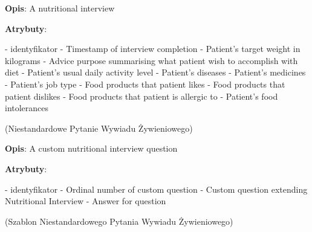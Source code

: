 \begin{enumerate}[label={\textbf{KAT/\protect\threedigits{\theenumi}}}, wide, labelwidth=!, labelindent=0pt, labelsep=0pt, series=reqs]
    \textbf{Opis}: A nutritional interview
    \par
    \textbf{Atrybuty}:
    \begin{itemize}[series=atr, wide, align=left, leftmargin=190pt]
         \label{kat:NutritionalInterview:id} - identyfikator
         \label{kat:NutritionalInterview:completionDate} - Timestamp of interview completion
         \label{kat:NutritionalInterview:targetWeight} - Patient's target weight in kilograms
         \label{kat:NutritionalInterview:advicePurpose} - Advice purpose summarising what patient wish to accomplish with diet
         \label{kat:NutritionalInterview:physicalActivity} - Patient's usual daily activity level
         \label{kat:NutritionalInterview:diseases} - Patient's diseases
         \label{kat:NutritionalInterview:medicines} - Patient's medicines
         \label{kat:NutritionalInterview:jobType} - Patient's job type
         \label{kat:NutritionalInterview:likedProducts} - Food products that patient likes
         \label{kat:NutritionalInterview:dislikedProducts} - Food products that patient dislikes
         \label{kat:NutritionalInterview:foodAllergies} - Food products that patient is allergic to
         \label{kat:NutritionalInterview:foodIntolerances} - Patient's food intolerances
    \end{itemize}

     \label{kat:CustomNutritionalInterviewQuestion} (Niestandardowe Pytanie Wywiadu Żywieniowego)

    \textbf{Opis}: A custom nutritional interview question
    \par
    \textbf{Atrybuty}:
    \begin{itemize}[series=atr, wide, align=left, leftmargin=190pt]
         \label{kat:CustomNutritionalInterviewQuestion:id} - identyfikator
         \label{kat:CustomNutritionalInterviewQuestion:ordinalNumber} - Ordinal number of custom question
         \label{kat:CustomNutritionalInterviewQuestion:question} - Custom question extending Nutritional Interview
         \label{kat:CustomNutritionalInterviewQuestion:answer} - Answer for question
    \end{itemize}

     \label{kat:CustomNutritionalInterviewQuestionTemplate} (Szablon Niestandardowego Pytania Wywiadu Żywieniowego)


\end{enumerate}
